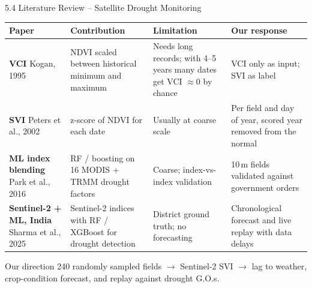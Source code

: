 \documentclass[aspectratio=169,10pt]{beamer}
\begin{document}
\begin{frame}{5.4 Literature Review -- Satellite Drought Monitoring}
\footnotesize
\renewcommand{\arraystretch}{1.45}
\begin{tabularx}{\textwidth}{@{}p{3.3cm}YYY@{}}
\toprule
\textbf{Paper} & \textbf{Contribution} & \textbf{Limitation} & \textbf{Our response} \\ \midrule
\textbf{VCI} \newline Kogan, 1995 & NDVI scaled between historical minimum and maximum & Needs long records; with 4--5 years many dates get VCI $\approx 0$ by chance & VCI only as input; SVI as label \\
\textbf{SVI} \newline Peters et al., 2002 & z-score of NDVI for each date & Usually at coarse scale & Per field and day of year, scored year removed from the normal \\
\textbf{ML index blending} \newline Park et al., 2016 & RF / boosting on 16 MODIS + TRMM drought factors & Coarse; index-vs-index validation & 10\,m fields validated against government orders \\
\textbf{Sentinel-2 + ML, India} \newline Sharma et al., 2025 & Sentinel-2 indices with RF / XGBoost for drought detection & District ground truth; no forecasting & Chronological forecast and live replay with data delays \\
\bottomrule
\end{tabularx}
\begin{block}{Our direction}
\footnotesize 240 randomly sampled fields $\rightarrow$ Sentinel-2 SVI $\rightarrow$ lag to weather, crop-condition forecast, and replay against drought G.O.s.
\end{block}
\end{frame}
\end{document}
